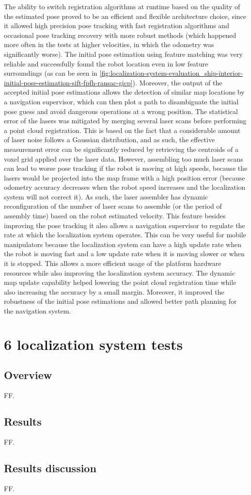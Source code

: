 The ability to switch registration algorithms at runtime based on the quality of the estimated pose proved to be an efficient and flexible architecture choice, since it allowed high precision pose tracking with fast registration algorithms and occasional pose tracking recovery with more robust methods (which happened more often in the tests at higher velocities, in which the odometry was significantly worse). The initial pose estimation using feature matching was very reliable and successfully found the robot location even in low feature surroundings (as can be seen in \cref{fig:localization-system-evaluation_ship-interior-initial-pose-estimation-sift-fpfh-ransac-gicp}). Moreover, the output of the accepted initial pose estimations allows the detection of similar map locations by a navigation supervisor, which can then plot a path to disambiguate the initial pose guess and avoid dangerous operations at a wrong position. The statistical error of the lasers was mitigated by merging several laser scans before performing a point cloud registration. This is based on the fact that a considerable amount of laser noise follows a Gaussian distribution, and as such, the effective measurement error can be significantly reduced by retrieving the centroids of a voxel grid applied over the laser data. However, assembling too much laser scans can lead to worse pose tracking if the robot is moving at high speeds, because the lasers would be projected into the map frame with a high position error (because odometry accuracy decreases when the robot speed increases and the localization system will not correct it). As such, the laser assembler has dynamic reconfiguration of the number of laser scans to assemble (or the period of assembly time) based on the robot estimated velocity. This feature besides improving the pose tracking it also allows a navigation supervisor to regulate the rate at which the localization system operates. This can be very useful for mobile manipulators because the localization system can have a high update rate when the robot is moving fast and a low update rate when it is moving slower or when it is stopped. This allows a more efficient usage of the platform hardware resources while also improving the localization system accuracy. The dynamic map update capability helped lowering the point cloud registration time while also increasing the accuracy by a small margin. Moreover, it improved the robustness of the initial pose estimations and allowed better path planning for the navigation system.



\section{6  localization system tests}

\subsection{Overview}

FF.

\subsection{Results}

FF.

\subsection{Results discussion}

FF.

